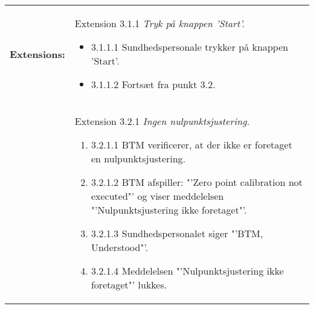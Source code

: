 \begin{table}[H]
\begin{tabular}{|l|p{10cm}|}
\\\hline
\textbf{Extensions:} & Extension 3.1.1 \textit{Tryk på knappen 'Start'.}
\begin{itemize}
\setlength\itemsep{0.1em}
\item[\labelname]3.1.1.1   Sundhedspersonale trykker på knappen 'Start'.
\item[\labelname]3.1.1.2   Fortsæt fra punkt 3.2. 
\end{itemize}
\\
& Extension 3.2.1 \textit{Ingen nulpunktsjustering.}
\begin{enumerate}
\setlength\itemsep{0.1em}
\item[\labelname]3.2.1.1   BTM verificerer, at der ikke er foretaget en nulpunktsjustering. 
\item[\labelname]3.2.1.2   BTM afspiller: "'Zero point calibration not executed"' og viser meddelelsen "'Nulpunktsjustering ikke foretaget"'. 
\item[\labelname]3.2.1.3   Sundhedspersonalet siger "'BTM, Understood"'.
\item[\labelname]3.2.1.4   Meddelelsen "'Nulpunktsjustering ikke foretaget"' lukkes.
\end{enumerate}
\\\hline
\end{tabular}
\end{table}

